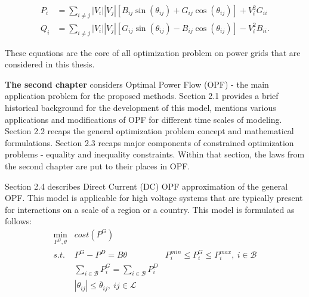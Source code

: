 \begin{equation}
    \begin{aligned}
        P_i &= \sum_{i\neq j} |V_i||V_j| \left[ B_{ij} \sin(\theta_{ij}) + G_{ij} \cos(\theta_{ij}) \right] + V_i^2 G_{ii} \\ 
        Q_i &= \sum_{i\neq j} |V_i||V_j| \left[ G_{ij} \sin(\theta_{ij}) - B_{ij} \cos(\theta_{ij}) \right] - V_i^2 B_{ii}.
    \end{aligned}
    \label{eq:power_injections}
\end{equation}

These equations are the core of all optimization problem on power grids that are considered in this thesis.



\textbf{The second chapter} considers Optimal Power Flow (OPF) - the main application problem for the proposed methods. Section 2.1 provides a brief historical background for the development of this model, mentions various applications and modifications of OPF for different time scales of modeling. 
Section 2.2 recaps the general optimization problem concept and mathematical formulations.
Section 2.3 recaps major components of constrained optimization problems - equality and inequality constraints. Within that section, the laws from the second chapter are put to their places in OPF.

Section 2.4 describes Direct Current (DC) OPF approximation of the general OPF. This model is applicable for high voltage systems that are typically present for interactions on a scale of a region or a country. This model is formulated as follows:
\begin{equation}
    \begin{aligned}
        \min_{P^G, \theta}  & \textit{cost}(P^G) \\
        \textit{s.t. }      & P^G - P^D = B\theta
                            & P_i^{min} \leq P_i^G \leq P_i^{max}, ~ i \in \mathcal{B} \\ 
                            & \sum_{i \in \mathcal{B}} P^G_i = \sum_{i \in \mathcal{B}} P^D_i \\
                            & |\theta_{ij}| \leq \bar{\theta}_{ij}, ~ ij \in \mathcal{L}
    \end{aligned}
    \label{eq:dc-opf}
\end{equation}

